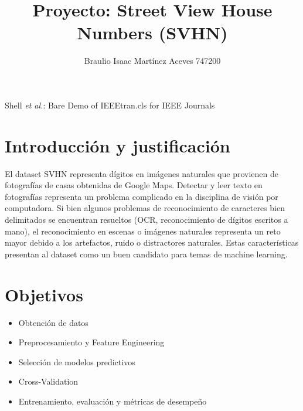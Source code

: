 \documentclass[journal]{IEEEtran}
\begin{document}
\title{Proyecto: Street View House Numbers (SVHN)}

\author {Braulio Isaac Martínez Aceves 747200
        }%
        
{Shell \MakeLowercase{\textit{et al.}}: Bare Demo of IEEEtran.cls for IEEE Journals}

\maketitle


\section{Introducción y justificación}

El dataset SVHN representa dígitos en imágenes naturales que provienen de fotografías de casas obtenidas de Google Maps. Detectar y leer texto en fotografías representa un problema complicado en la disciplina de visión por computadora. Si bien algunos problemas de reconocimiento de caracteres bien delimitados se encuentran resueltos (OCR, reconocimiento de dígitos escritos a mano), el reconocimiento en escenas o imágenes naturales representa un reto mayor debido a los artefactos, ruido o distractores naturales.\cite{svhn} Estas características presentan al dataset como un buen candidato para temas de machine learning.

\section{Objetivos}
\begin{itemize}
        \item Obtención de datos
        \item Preprocesamiento y Feature Engineering
        \item Selección de modelos predictivos
        \item Cross-Validation
        \item Entrenamiento, evaluación y métricas de desempeño
\end{itemize}
\end{document}
